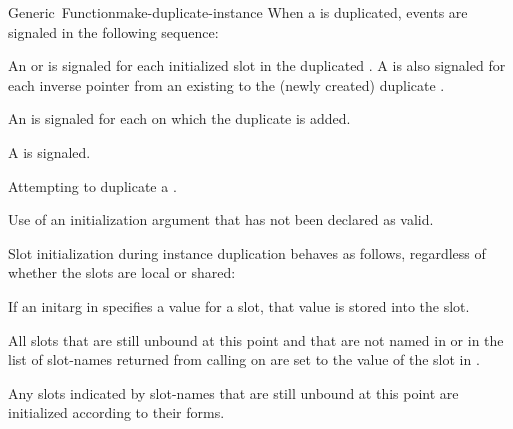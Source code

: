 \documentclass[10pt,twoside,english,pdftex]{article}
\begin{document}
\begin{functiondoc}{Generic~Function}{make-duplicate-instance}{%
     
     
    }
\fnevents
{}%
%
%
%
%
%
%
%
%
%
%
%
When a  is duplicated, events are signaled in the
following sequence: 
\begin{tightenumerate}
\item An  or  is
  signaled for each initialized slot in the duplicated
  .  A  is also signaled for
  each inverse pointer from an existing  to the
  (newly created) duplicate .
\item An  is signaled
  for each  on which the duplicate
   is added.
\item A  is signaled.
\end{tightenumerate}

\fnerrors Attempting to duplicate a
.

Use of an initialization argument that has not been declared as valid.

%
%
%
\fndescription 
%
Slot initialization during instance duplication behaves as follows, regardless
of whether the slots are local or shared:
%
\begin{tightitemize}
\item If an initarg in  specifies a value for a slot, that
  value is stored into the slot.
\item All slots that are still unbound at this point and that are not named in
   or in the list of slot-names returned from
  calling  on
   are set to the value of the slot in .
\item Any slots indicated by slot-names that are still unbound at this point
  are initialized according to their  forms. 
\end{tightitemize}


\end{functiondoc}
\end{document}
